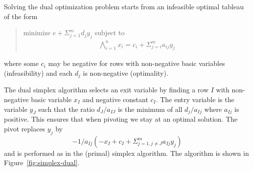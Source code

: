 \documentclass{article}
\begin{document}
Solving the dual optimization problem starts from
an infeasible optimal tableau of the form
\begin{quote}\vspace*{-1ex}
minimize $e + \Sigma_{j=1}^m d_j y_j$ subject to
$$\begin{array}{rcl}
\bigwedge_{i=1}^{n} x_i = c_i + \Sigma_{j=i}^m a_{ij} y_j
\end{array}$$
\end{quote}\vspace{-0.9ex}
where some $c_i$ may be negative 
for rows with non-negative basic variables (infeasibility) 
and each $d_j$ is non-negative (optimality).

The dual simplex algorithm selects an exit variable
by finding a row $I$ with non-negative basic variable
$x_I$ and negative constant $c_I$\@.  
The entry variable is the variable $y_J$
such that
the ratio $d_J/a_{IJ}$ is the minimum of all $d_j/a_{Ij}$
where $a_{Ij}$ is positive. This ensures that when pivoting we stay at an
optimal solution.
The pivot replaces $y_j$ by
$$-1/a_{Ij} (-x_I + c_I + \Sigma_{j=1, j\neq J }^m a_{Ij} y_j)$$
and is performed as in the (primal) simplex algorithm.
The algorithm is shown in Figure~\ref{fig:simplex-dual}.
\end{document}
